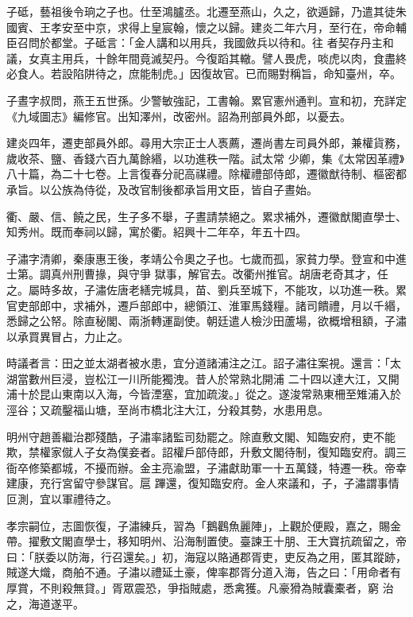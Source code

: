 \begin{pinyinscope}
 子砥，藝祖後令珦之子也。仕至鴻臚丞。北遷至燕山，久之，欲遁歸，乃遣其徒朱國賓、王孝安至中京，求得上皇宸翰，懷之以歸。建炎二年六月，至行在，帝命輔臣召問於都堂。子砥言：「金人講和以用兵，我國斂兵以待和。往
 者契存丹主和議，女真主用兵，十餘年間竟滅契丹。今復蹈其轍。譬人畏虎，啖虎以肉，食盡終必食人。若設陷阱待之，庶能制虎。」因復故官。已而賜對稱旨，命知臺州，卒。



 子晝字叔問，燕王五世孫。少警敏強記，工書翰。累官憲州通判。宣和初，充詳定《九域圖志》編修官。出知澤州，改密州。詔為刑部員外郎，以憂去。



 建炎四年，遷吏部員外郎。尋用大宗正士人褭薦，遷尚書左司員外郎，兼權貨務，歲收茶、鹽、香錢六百九萬餘緡，以功進秩一階。試太常
 少卿，集《太常因革禮》八十篇，為二十七卷。上言復春分祀高禖禮。除權禮部侍郎，遷徽猷待制、樞密都承旨。以公族為侍從，及改官制後都承旨用文臣，皆自子晝始。



 衢、嚴、信、饒之民，生子多不舉，子晝請禁絕之。累求補外，遷徽猷閣直學士、知秀州。既而奉祠以歸，寓於衢。紹興十二年卒，年五十四。



 子潚字清卿，秦康惠王後，孝靖公令奧之子也。七歲而孤，家貧力學。登宣和中進士第。調真州刑曹掾，與守爭
 獄事，解官去。改衢州推官。胡唐老奇其才，任之。屬時多故，子潚佐唐老繕完城具，苗、劉兵至城下，不能攻，以功進一秩。累官吏部郎中，求補外，遷戶部郎中，總領江、淮軍馬錢糧。諸司饋禮，月以千緡，悉歸之公帑。除直秘閣、兩浙轉運副使。朝廷遣人檢沙田蘆場，欲概增租額，子潚以承買異冒占，力止之。



 時議者言：田之並太湖者被水患，宜分道諸浦注之江。詔子潚往案視。還言：「太湖當數州巨浸，豈松江一川所能獨洩。昔人於常熟北開浦
 二十四以達大江，又開浦十於昆山東南以入海，今皆湮塞，宜加疏浚。」從之。遂浚常熟東柵至雉浦入於涇谷；又疏鑿福山塘，至尚市橋北注大江，分殺其勢，水患用息。



 明州守趙善繼治郡殘酷，子潚率諸監司劾罷之。除直敷文閣、知臨安府，吏不能欺，禁權家僦人子女為僕妾者。詔權戶部侍郎，升敷文閣待制，復知臨安府。調三衙卒修築都城，不擾而辦。金主亮渝盟，子潚獻助軍一十五萬錢，特遷一秩。帝幸建康，充行宮留守參謀官。扈
 蹕還，復知臨安府。金人來議和，子，子潚謂事情叵測，宜以軍禮待之。



 孝宗嗣位，志圖恢復，子潚練兵，習為「鵝鸛魚麗陣」，上觀於便殿，嘉之，賜金帶。擢敷文閣直學士，移知明州、沿海制置使。臺諫王十朋、王大寶抗疏留之，帝曰：「朕委以防海，行召還矣。」初，海寇以賂通郡胥吏，吏反為之用，匿其蹤跡，賊遂大熾，商舶不通。子潚以禮延土豪，俾率郡胥分道入海，告之曰：「用命者有厚賞，不則殺無貸。」胥眾震恐，爭指賊處，悉禽獲。凡豪猾為賊囊橐者，窮
 治之，海道遂平。




\end{pinyinscope}
